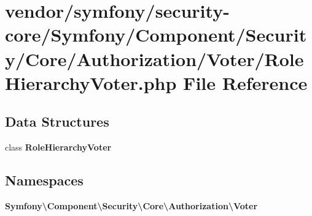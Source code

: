 \section{vendor/symfony/security-\/core/\+Symfony/\+Component/\+Security/\+Core/\+Authorization/\+Voter/\+Role\+Hierarchy\+Voter.php File Reference}
\label{_role_hierarchy_voter_8php}
\subsection*{Data Structures}
\begin{DoxyCompactItemize}
\item 
class {\bf Role\+Hierarchy\+Voter}
\end{DoxyCompactItemize}
\subsection*{Namespaces}
\begin{DoxyCompactItemize}
\item 
 {\bf Symfony\textbackslash{}\+Component\textbackslash{}\+Security\textbackslash{}\+Core\textbackslash{}\+Authorization\textbackslash{}\+Voter}
\end{DoxyCompactItemize}
